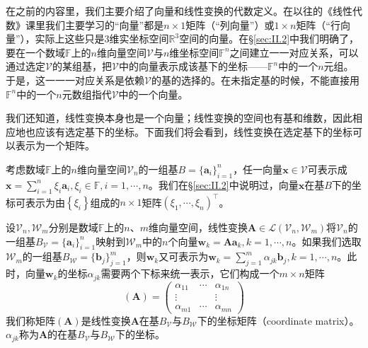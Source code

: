 \documentclass[main.tex]{subfiles}
\begin{document}
在之前的内容里，我们主要介绍了向量和线性变换的代数定义。在以往的《线性代数》课里我们主要学习的“向量”都是$n\times 1$矩阵（“列向量”）或$1\times n$矩阵（“行向量”），实际上这些只是3维实坐标空间$\mathbb{R}^3$空间的向量。在\S\ref{sec:II.2}中我们明确了，要在一个数域$\mathbb{F}$上的$n$维向量空间$\mathcal{V}$与$n$维坐标空间$\mathbb{F}^n$之间建立一一对应关系，可以通过选定$\mathcal{V}$的某组基，把$\mathcal{V}$中的向量表示成该基下的坐标——$\mathbb{F}^n$中的一个$n$元组。于是，这一一一对应关系是依赖$\mathcal{V}$的基的选择的。在未指定基的时候，不能直接用$\mathbb{F}^n$中的一个$n$元数组指代$\mathcal{V}$中的一个向量。

我们还知道，线性变换本身也是一个向量；线性变换的空间也有基和维数，因此相应地也应该有选定基下的坐标。下面我们将会看到，线性变换在选定基下的坐标可以表示为一个矩阵\cite[\S7.3“3”,p.~178]{周胜林2012线性代数}。

考虑数域$\mathbb{F}$上的$n$维向量空间$\mathcal{V}_n$的一组基$B=\{\mathbf{a}_i\}_{i=1}^n$，任一向量$\mathbf{x}\in\mathcal{V}$可表示成$\mathbf{x}=\sum_{i=1}^n\xi_i\mathbf{a}_i,\xi_i\in\mathbb{F},i=1,\cdots,n$。我们在\S\ref{sec:II.2}中说明过，向量$\mathbf{x}$在基$B$下的坐标可表示为由$\left\{\xi_i\right\}$组成的$n\times 1$矩阵$\left(\xi_1,\cdots,\xi_n\right)^\intercal$。

设$\mathcal{V}_n,\mathcal{W}_m$分别是数域$\mathbb{F}$上的$n$、$m$维向量空间，线性变换$\mathbf{A}\in\mathcal{L}\left(\mathcal{V}_n,\mathcal{W}_m\right)$将$\mathcal{V}_n$的一组基$B_\mathcal{V}=\{\mathbf{a}_i\}_{i=1}^n$映射到$\mathcal{W}_m$中的$n$个向量$\mathbf{w}_k=\mathbf{Aa}_k,k=1,\cdots,n$。如果我们选取$\mathcal{W}_m$的一组基$B_\mathcal{W}=\{\mathbf{b}_j\}_{j=1}^m$，则$\mathbf{w}_k$又可表示为$\mathbf{w}_k=\sum_{j=1}^m\alpha_{jk}\mathbf{b}_j,k=1,\cdots,n$。此时，向量$\mathbf{w}_k$的坐标$\alpha_{jk}$需要两个下标来统一表示，它们构成一个$m\times n$矩阵
\[\left(\mathbf{A}\right)=\left(\begin{array}{ccc}\alpha_{11}&\cdots&\alpha_{1n}\\\vdots&&\vdots\\\alpha_{m1}&\cdots&\alpha_{mn}\end{array}\right)\]
我们称矩阵$\left(\mathbf{A}\right)$是线性变换$\mathbf{A}$在基$B_\mathcal{V}$与$B_\mathcal{W}$下的坐标矩阵（coordinate matrix）。$\alpha_{jk}$称为$\mathbf{A}$的在基$B_\mathcal{V}$与$B_\mathcal{W}$下的坐标。
\end{document}
